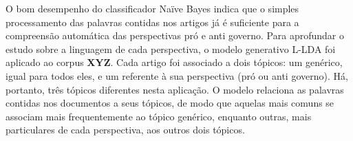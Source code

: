 
O bom desempenho do classificador Naïve Bayes indica que o simples processamento das palavras contidas nos artigos já é suficiente para a compreensão automática das perspectivas pró e anti governo. Para aprofundar o estudo sobre a linguagem de cada perspectiva, o modelo generativo L-LDA foi aplicado ao corpus \textbf{XYZ}. Cada artigo foi associado a dois tópicos: um genérico, igual para todos eles, e um referente à sua perspectiva (pró ou anti governo). Há, portanto, três tópicos diferentes nesta aplicação. O modelo relaciona as palavras contidas nos documentos a seus tópicos, de modo que aquelas mais comuns se associam mais frequentemente ao tópico genérico, enquanto outras, mais particulares de cada perspectiva, aos outros dois tópicos.   




